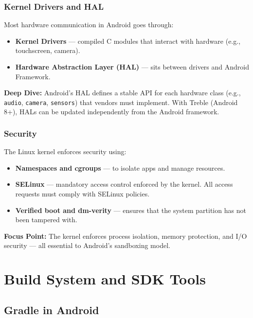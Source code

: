 \documentclass[a4paper,12pt]{article}
\begin{document}
\subsubsection{Kernel Drivers and HAL}

Most hardware communication in Android goes through:

\begin{itemize}
  \item \textbf{Kernel Drivers} — compiled C modules that interact with hardware (e.g., touchscreen, camera).
  \item \textbf{Hardware Abstraction Layer (HAL)} — sits between drivers and Android Framework.
\end{itemize}

\textbf{Deep Dive:} Android’s HAL defines a stable API for each hardware class (e.g., \texttt{audio}, \texttt{camera}, \texttt{sensors}) that vendors must implement. With Treble (Android 8+), HALs can be updated independently from the Android framework.

\subsubsection{Security}

The Linux kernel enforces security using:

\begin{itemize}
  \item \textbf{Namespaces and cgroups} — to isolate apps and manage resources.
  \item \textbf{SELinux} — mandatory access control enforced by the kernel. All access requests must comply with SELinux policies.
  \item \textbf{Verified boot and dm-verity} — ensures that the system partition has not been tampered with.
\end{itemize}

\textbf{Focus Point:} The kernel enforces process isolation, memory protection, and I/O security — all essential to Android’s sandboxing model.


\section{Build System and SDK Tools}

\subsection{Gradle in Android}
\end{document}
